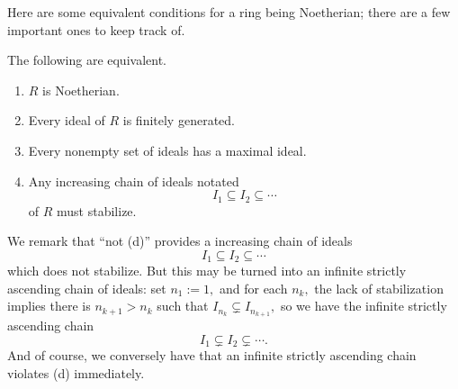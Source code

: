 Here are some equivalent conditions for a ring being Noetherian; there are a few important ones to keep track of.
\begin{proposition}
	The following are equivalent.
	\begin{enumerate}[label=(\alph*)]
		\item $R$ is Noetherian.
		\item Every ideal of $R$ is finitely generated.
		\item Every nonempty set of ideals has a maximal ideal.
		\item Any increasing chain of ideals notated
		\[I_1\subseteq I_2\subseteq\cdots\]
		of $R$ must stabilize.
	\end{enumerate}
\end{proposition}
We remark that ``not (d)'' provides a increasing chain of ideals
\[I_1\subseteq I_2\subseteq\cdots\]
which does not stabilize. But this may be turned into an infinite strictly ascending chain of ideals: set $n_1:=1,$ and for each $n_k,$ the lack of stabilization implies there is $n_{k+1}>n_k$ such that $I_{n_k}\subsetneq I_{n_{k+1}},$ so we have the infinite strictly ascending chain
\[I_1\subsetneq I_2\subsetneq\cdots.\]
And of course, we conversely have that an infinite strictly ascending chain violates (d) immediately.
